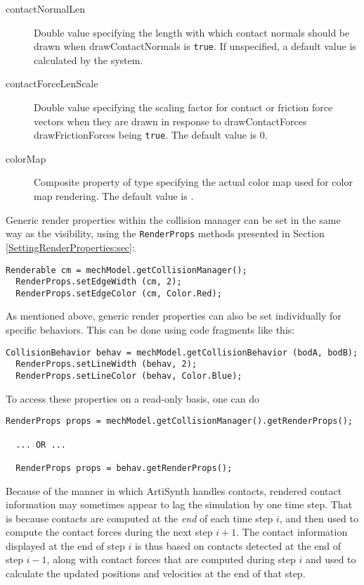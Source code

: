 \begin{description}

\item[contactNormalLen]\mbox{}

Double value specifying the length with which contact normals should
be drawn when {\sf drawContactNormals} is {\tt true}. If unspecified,
a default value is calculated by the system.

\item[contactForceLenScale]\mbox{}

Double value specifying the scaling factor for contact or friction
force vectors when they are drawn in response to {\sf
drawContactForces} {\sf drawFrictionForces} being {\tt true}.  The
default value is 0.

\item[colorMap]\mbox{}

Composite property of type 
specifying the actual color map used for color map rendering.
The default value is 
.

\end{description}


Generic render properties within the collision manager can be
set in the same way as the visibility, using the {\tt RenderProps}
methods presented in Section \ref{SettingRenderProperties:sec}:
\begin{lstlisting}[]
  Renderable cm = mechModel.getCollisionManager();
  RenderProps.setEdgeWidth (cm, 2);
  RenderProps.setEdgeColor (cm, Color.Red);
\end{lstlisting}

As mentioned above, generic render properties can also be set
individually for specific behaviors. This can be done using code
fragments like this:
\begin{lstlisting}[]
  CollisionBehavior behav = mechModel.getCollisionBehavior (bodA, bodB);
  RenderProps.setLineWidth (behav, 2);
  RenderProps.setLineColor (behav, Color.Blue);
\end{lstlisting}
To access these properties on a read-only basis, one can do
\begin{lstlisting}[]
  RenderProps props = mechModel.getCollisionManager().getRenderProps();

  ... OR ...

  RenderProps props = behav.getRenderProps();
\end{lstlisting}

\begin{sideblock}
Because of the manner in which ArtiSynth handles contacts, rendered
contact information may sometimes appear to lag the simulation by one
time step. That is because contacts are computed at the {\it end} of
each time step $i$, and then used to compute the contact forces during
the next step $i+1$. The contact information displayed at the end of
step $i$ is thus based on contacts detected at the end of step $i-1$,
along with contact forces that are computed during step $i$ and used to
calculate the updated positions and velocities at the end of that step.
\end{sideblock}


